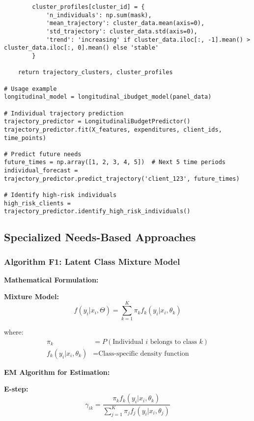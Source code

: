 \begin{lstlisting}
        cluster_profiles[cluster_id] = {
            'n_individuals': np.sum(mask),
            'mean_trajectory': cluster_data.mean(axis=0),
            'std_trajectory': cluster_data.std(axis=0),
            'trend': 'increasing' if cluster_data.iloc[:, -1].mean() > cluster_data.iloc[:, 0].mean() else 'stable'
        }
    
    return trajectory_clusters, cluster_profiles

# Usage example
longitudinal_model = longitudinal_ibudget_model(panel_data)

# Individual trajectory prediction
trajectory_predictor = LongitudinaliBudgetPredictor()
trajectory_predictor.fit(X_features, expenditures, client_ids, time_points)

# Predict future needs
future_times = np.array([1, 2, 3, 4, 5])  # Next 5 time periods
individual_forecast = trajectory_predictor.predict_trajectory('client_123', future_times)

# Identify high-risk individuals
high_risk_clients = trajectory_predictor.identify_high_risk_individuals()
\end{lstlisting}

\subsection{Specialized Needs-Based Approaches}

\subsubsection{Algorithm F1: Latent Class Mixture Model}

\textbf{Mathematical Formulation:}

\textbf{Mixture Model:}
\begin{equation}
f(y_i | x_i, \Theta) = \sum_{k=1}^{K} \pi_k f_k(y_i | x_i, \theta_k)
\end{equation}

where:
\begin{align}
\pi_k &= P(\text{Individual } i \text{ belongs to class } k) \\
f_k(y_i | x_i, \theta_k) &= \text{Class-specific density function}
\end{align}

\textbf{EM Algorithm for Estimation:}

\textbf{E-step:}
\begin{equation}
\gamma_{ik} = \frac{\pi_k f_k(y_i | x_i, \theta_k)}{\sum_{j=1}^{K} \pi_j f_j(y_i | x_i, \theta_j)}
\end{equation}

